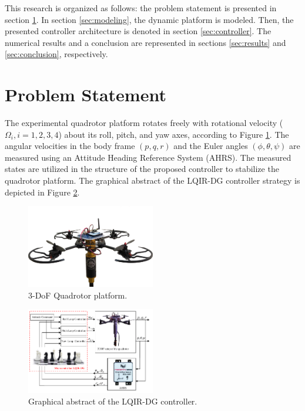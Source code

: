 \documentclass[peerreview]{IEEEtran}
\begin{document}
This research is organized as follows: the problem statement is presented in section \ref{sec:problem}. In section \ref{sec:modeling}, the dynamic
platform is modeled. Then, the presented controller architecture is denoted in section \ref{sec:controller}. The numerical results and a conclusion are represented in sections \ref{sec:results} and
\ref{sec:conclusion}, respectively.

 

\section{Problem Statement}\label{sec:problem}
\noindent The experimental quadrotor platform rotates freely with rotational velocity ($\Omega_i, i = 1, 2, 3, 4$) about its roll, pitch, and yaw axes, according to Figure \ref{fig:quadrotor}.
The angular velocities in the body frame $(p, q, r)$ and the Euler angles $(\phi, \theta, \psi)$ are measured using an Attitude Heading Reference System (AHRS).
The measured states are utilized in the structure of the proposed controller to stabilize the quadrotor platform.
The graphical abstract of the LQIR-DG controller strategy is depicted in Figure \ref{fig:blockdiagram}.

\begin{figure}[H]
  \centering
  \includegraphics[width=0.5\textwidth]{../Figure/3DOFQuad.png}
  \caption{3-DoF Quadrotor platform.}
  \label{fig:quadrotor}
\end{figure}

\begin{figure}[H]
  \centering
  \includegraphics[width=0.5\textwidth]{../Figure/schematic.pdf}
  \caption{Graphical abstract of the LQIR-DG controller.}
  \label{fig:blockdiagram}
\end{figure}
\end{document}
